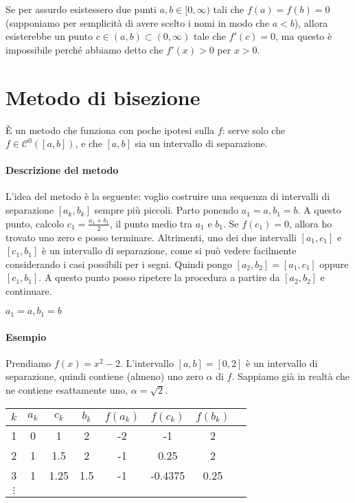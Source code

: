 \documentclass[a4paper]{report}
\theoremstyle{definiton}
\theoremstyle{remark}
\begin{document}
Se per assurdo esistessero due punti $a,b \in [0,\infty)$ tali che $f(a) = f(b) = 0$ (supponiamo per semplicità di avere scelto i nomi in modo che $a<b$), allora esisterebbe un punto $c \in (a,b) \subset (0,\infty)$ tale che $f'(c) = 0$, ma questo è impossibile perché abbiamo detto che $f'(x) > 0$ per $x>0$.

\section{Metodo di bisezione}

È un metodo che funziona con poche ipotesi sulla $f$: serve solo che $f \in \mathcal{C}^0([a,b])$, e che $[a,b]$ sia un intervallo di separazione.

\paragraph{Descrizione del metodo} L'idea del metodo è la seguente: voglio costruire una sequenza di intervalli di separazione $[a_k,b_k]$ sempre più piccoli. Parto ponendo $a_1 = a, b_1 = b$. A questo punto, calcolo $c_1 = \frac{a_1+b_1}{2}$, il punto medio tra $a_1$ e $b_1$. Se $f(c_1) = 0$, allora ho trovato uno zero e posso terminare. Altrimenti, uno dei due intervalli $[a_1,c_1]$ e $[c_1,b_1]$ è un intervallo di separazione, come si può vedere facilmente considerando i casi possibili per i segni. Quindi pongo $[a_2,b_2] = [a_1,c_1]$ oppure $[c_1,b_1]$. A questo punto posso ripetere la procedura a partire da $[a_2,b_2]$ e continuare.

\begin{algorithm}
$a_1=a,b_1=b$\;
\end{algorithm}

\paragraph{Esempio} Prendiamo $f(x) = x^2 - 2$. L'intervallo $[a,b] = [0,2]$ è un intervallo di separazione, quindi contiene (almeno) uno zero $\alpha$ di $f$. Sappiamo già in realtà che ne contiene esattamente uno, $\alpha=\sqrt{2}$.

\begin{center}
    \begin{tabular}{cccccccc}
        \toprule
        $k$ & $a_k$ & $c_k$ & $b_k$ & $f(a_k)$ & $f(c_k)$ & $f(b_k)$\\
        \midrule
        1 & 0 & 1 & 2 & -2 & -1 & 2\\
        2 & 1 & 1.5 & 2 & -1 & 0.25 & 2\\
        3 & 1 & 1.25 & 1.5 & -1 & -0.4375 & 0.25\\
        $\vdots$\\
        \bottomrule
    \end{tabular}
\end{center}
\end{document}
